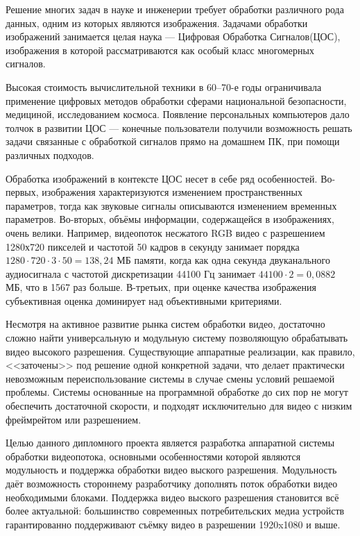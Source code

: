 \label{sec:intro}


Решение многих задач в науке и инженерии требует обработки различного рода данных, одним из которых являются изображения.
Задачами обработки изображений занимается целая наука --- Цифровая Обработка Сигналов(ЦОС),
изображения в которой рассматриваются как особый класс многомерных сигналов.

Высокая стоимость вычислительной техники в 60--70-е годы ограничивала применение
цифровых методов обработки сферами национальной безопасности, медициной, исследованием космоса.
Появление персональных компьютеров дало толчок в развитии ЦОС --- конечные пользователи
получили возможность решать задачи связанные с обработкой сигналов прямо на домашнем ПК,
при помощи различных подходов.

Обработка изображений в контексте ЦОС несет в себе ряд особенностей.
Во-первых, изображения характеризуются изменением пространственных параметров, тогда как звуковые сигналы описываются изменением временных параметров.
Во-вторых, объёмы информации, содержащейся в изображениях, очень велики.
Например, видеопоток несжатого RGB видео
с разрешением 1280х720 пикселей и частотой 50 кадров в секунду
занимает порядка $ 1280 \cdot 720 \cdot 3 \cdot 50 = 138,24 $ МБ памяти, когда как одна
секунда двуканального аудиосигнала с частотой дискретизации 44100 Гц
занимает $ 44100 \cdot 2 = 0,0882 $ МБ, что в 1567 раз больше. В-третьих, при оценке качества
изображения субъективная оценка доминирует над объективными критериями.

Несмотря на активное развитие рынка систем обработки видео, достаточно сложно найти
универсальную и модульную систему позволяющую обрабатывать видео высокого разрешения.
Существующие аппаратные реализации, как правило, <<заточены>> под решение одной конкретной задачи,
что делает практически невозможным переиспользование системы в случае смены условий решаемой проблемы.
Системы основанные на программной обработке до сих пор не могут обеспечить достаточной скорости, и подходят исключительно для видео с низким фреймрейтом или разрешением. %


Целью данного дипломного проекта является разработка аппаратной системы обработки
видеопотока, основными особенностями которой являются модульность и поддержка
обработки видео выского разрешения. Модульность даёт возможность стороннему
разработчику дополнять поток обработки видео необходимыми блоками.
Поддержка видео выского разрешения становится всё более актуальной:
большинство современных потребительских медиа устройств гарантированно
поддерживают съёмку видео в разрешении 1920x1080 и выше. %


